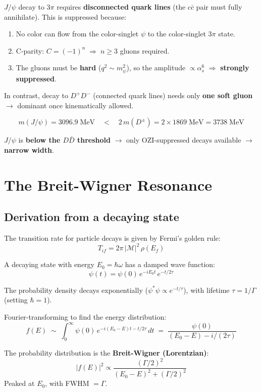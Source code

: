 \documentclass[11pt,a4paper]{article}
\newcommand{\keyword}[1]{\textbf{#1}}
\begin{document}
$J/\psi$ decay to $3\pi$ requires \keyword{disconnected quark lines}
(the $c\bar{c}$ pair must fully annihilate). This is suppressed because:

\begin{enumerate}
  \item No color can flow from the color-singlet $\psi$ to the color-singlet $3\pi$ state.
  \item C-parity: $C = (-1)^n \;\Rightarrow\; n \geq 3$ gluons required.
  \item The gluons must be \textbf{hard} ($q^2 \sim m_\psi^2$), so the amplitude
        $\propto \alpha_s^6$ $\Rightarrow$ \textbf{strongly suppressed}.
\end{enumerate}

In contrast, decay to $D^+D^-$ (connected quark lines) needs only \textbf{one soft gluon}
$\to$ dominant once kinematically allowed.

\[
  m(J/\psi) = 3096.9\;\mathrm{MeV}
  \quad < \quad
  2\,m(D^\pm) = 2 \times 1869\;\mathrm{MeV} = 3738\;\mathrm{MeV}
\]

$J/\psi$ is \textbf{below the $D\bar{D}$ threshold} $\to$ only OZI-suppressed decays
available $\to$ \textbf{narrow width}.

\section{The Breit-Wigner Resonance}

\subsection{Derivation from a decaying state}

The transition rate for particle decays is given by Fermi's golden rule:
\[
  T_{if} = 2\pi\,|\mathcal{M}|^2\,\rho(E_f)
\]

A decaying state with energy $E_0 = \hbar\omega$ has a damped wave function:
\[
  \psi(t) = \psi(0)\,e^{-iE_0 t}\,e^{-t/2\tau}
\]

The probability density decays exponentially ($\psi^*\psi \propto e^{-t/\tau}$), with
lifetime $\tau = 1/\Gamma$ (setting $\hbar = 1$).

Fourier-transforming to find the energy distribution:
\[
  f(E) \;\sim\; \int_0^\infty \psi(0)\,e^{-i(E_0 - E)t - t/2\tau}\,dt
  \;=\; \frac{\psi(0)}{(E_0 - E) - i/(2\tau)}
\]

The probability distribution is the \keyword{Breit-Wigner (Lorentzian)}:
\[
  |f(E)|^2 \propto \frac{(\Gamma/2)^2}{(E_0 - E)^2 + (\Gamma/2)^2}
\]
Peaked at $E_0$, with FWHM $= \Gamma$.
\end{document}
